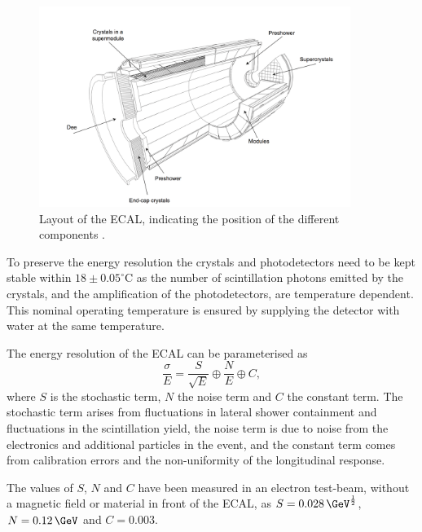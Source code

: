 \begin{figure}[h!]
\begin{center}
\includegraphics[width=0.9\textwidth]{./Detector/Plots/ECAL.png}
\caption[Layout of the ECAL, indicating the positions
of the different components.]{Layout of the \ac{ECAL}, indicating the position of the
different components \cite{cms-jinst}.}
\label{fig:CMS_ECAL}
\end{center}
\end{figure}

To preserve the energy resolution the crystals and
photodetectors need to be kept stable within $18\pm 0.05^{\circ}$C
as the number of scintillation photons emitted by the crystals,
and the amplification of the photodetectors, are temperature dependent.
This nominal operating temperature is ensured by 
supplying the detector with water at the same temperature.

The energy resolution of the \ac{ECAL} can be parameterised as
\begin{equation}\label{eqn:ecalres}
\frac{\sigma}{E} = \frac{S}{\sqrt{E}}\oplus\frac{N}{E}\oplus C,
\end{equation}
where $S$ is the stochastic term, $N$ the noise term and $C$ the constant term.
The stochastic term arises from fluctuations in lateral shower containment and 
fluctuations in the scintillation yield, the noise term is due to noise from the electronics
and additional particles in the event, and the constant term comes
from calibration errors and the non-uniformity of the longitudinal response.

The values of $S$, $N$ and $C$ have been measured in an electron
test-beam, without a magnetic field or material in front of the \ac{ECAL}, as 
$S = 0.028\,\GeV^{\frac{1}{2}}$, $N = 0.12\,\GeV$ and $C= 0.003$.


